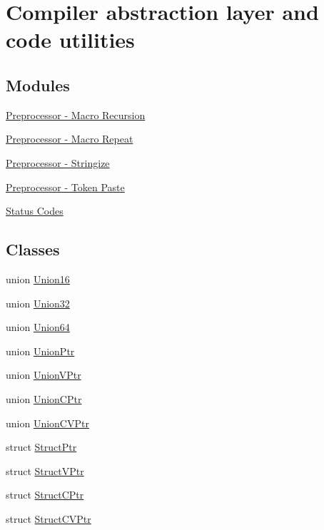 \hypertarget{group__group__sam0__utils}{}\section{Compiler abstraction layer and code utilities}
\label{group__group__sam0__utils}
\subsection*{Modules}
\begin{DoxyCompactItemize}
\item 
\hyperlink{group__group__sam0__utils__mrecursion}{Preprocessor -\/ Macro Recursion}
\item 
\hyperlink{group__group__sam0__utils__mrepeat}{Preprocessor -\/ Macro Repeat}
\item 
\hyperlink{group__group__sam0__utils__stringz}{Preprocessor -\/ Stringize}
\item 
\hyperlink{group__group__sam0__utils__tpaste}{Preprocessor -\/ Token Paste}
\item 
\hyperlink{group__group__sam0__utils__status__codes}{Status Codes}
\end{DoxyCompactItemize}
\subsection*{Classes}
\begin{DoxyCompactItemize}
\item 
union \hyperlink{union_union16}{Union16}
\item 
union \hyperlink{union_union32}{Union32}
\item 
union \hyperlink{union_union64}{Union64}
\item 
union \hyperlink{union_union_ptr}{Union\+Ptr}
\item 
union \hyperlink{union_union_v_ptr}{Union\+V\+Ptr}
\item 
union \hyperlink{union_union_c_ptr}{Union\+C\+Ptr}
\item 
union \hyperlink{union_union_c_v_ptr}{Union\+C\+V\+Ptr}
\item 
struct \hyperlink{struct_struct_ptr}{Struct\+Ptr}
\item 
struct \hyperlink{struct_struct_v_ptr}{Struct\+V\+Ptr}
\item 
struct \hyperlink{struct_struct_c_ptr}{Struct\+C\+Ptr}
\item 
struct \hyperlink{struct_struct_c_v_ptr}{Struct\+C\+V\+Ptr}
\end{DoxyCompactItemize}
